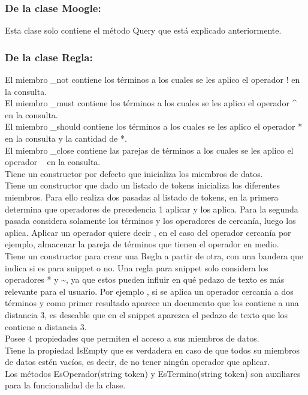 \documentclass{article}
\begin{document}
\subsubsection{De la clase Moogle:}
Esta clase solo contiene el método Query que está explicado anteriormente.

\subsubsection{De la clase Regla:}
El miembro \_not contiene los términos a los cuales se les aplico el operador ! en la consulta.\\
El miembro \_must contiene los términos a los cuales se les aplico el operador \^{} en la consulta.\\
El miembro \_should contiene los términos a los cuales se les aplico el operador * en la consulta y la cantidad de *.\\
El miembro \_close contiene las parejas de términos a los cuales se les aplico el operador ~ en la consulta.\\
Tiene un constructor por defecto que inicializa los miembros de datos.\\
Tiene un constructor que dado un listado de tokens inicializa los diferentes miembros.  Para ello realiza dos pasadas al listado de tokens, en la primera determina que operadores de precedencia 1 aplicar y los aplica. Para la segunda pasada considera solamente los términos y los operadores de cercanía, luego los aplica. Aplicar un operador quiere decir , en el caso del operador cercanía por ejemplo, almacenar la pareja de términos que tienen el operador en medio.\\
Tiene un constructor para crear una Regla a partir de otra, con una bandera que indica si es para snippet o no. Una regla para snippet solo considera los operadores * y \~{}, ya que estos pueden influir en qué pedazo de texto es más relevante para el usuario. Por ejemplo ,  si se aplica un operador cercanía a dos términos y como primer resultado aparece un documento que los contiene a una distancia 3, es deseable que en el snippet aparezca el pedazo de texto que los contiene a distancia 3.\\
Posee 4 propiedades que permiten el acceso a sus miembros de datos.\\
Tiene la propiedad IsEmpty que es verdadera en caso de que todos su miembros de datos estén vacíos, es decir, de no tener ningún operador que aplicar.\\
Los métodos EsOperador(string token) y EsTermino(string token) son auxiliares para la funcionalidad de la clase.\\
\end{document}
